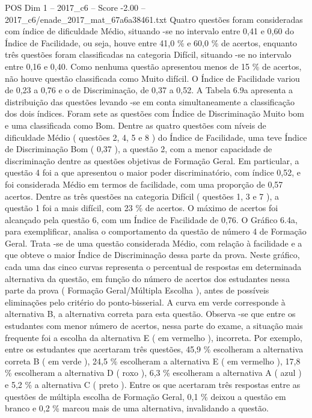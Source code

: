\begin{textsample}{POS Dim 1 – 2017\_c6 – Score -2.00 – 2017\_c6/enade\_2017\_mat\_67a6a38461.txt}
Quatro questões foram consideradas com índice de dificuldade Médio, situando -se no intervalo entre 0,41 e 0,60 do Índice de Facilidade, ou seja, houve entre 41,0 \% e 60,0 \% de acertos, enquanto três questões foram classificadas na categoria Difícil, situando -se no intervalo entre 0,16 e 0,40.
Como nenhuma questão apresentou menos de 15 \% de acertos, não houve questão classificada como Muito difícil.
O Índice de Facilidade variou de 0,23 a 0,76 e o de Discriminação, de 0,37 a 0,52.
A Tabela 6.9a apresenta a distribuição das questões levando -se em conta simultaneamente a classificação dos dois índices.
Foram sete as questões com Índice de Discriminação Muito bom e uma classificada como Bom.
Dentre as quatro questões com níveis de dificuldade Médio ( questões 2, 4, 5 e 8 ) do Índice de Facilidade, uma teve Índice de Discriminação Bom ( 0,37 ), a questão 2, com a menor capacidade de discriminação dentre as questões objetivas de Formação Geral.
Em particular, a questão 4 foi a que apresentou o maior poder discriminatório, com índice 0,52, e foi considerada Médio em termos de facilidade, com uma proporção de 0,57 acertos.
Dentre as três questões na categoria Difícil ( questões 1, 3 e 7 ), a questão 1 foi a mais difícil, com 23 \% de acertos.
O máximo de acertos foi alcançado pela questão 6, com um Índice de Facilidade de 0,76.
O Gráfico 6.4a, para exemplificar, analisa o comportamento da questão de número 4 de Formação Geral.
Trata -se de uma questão considerada Médio, com relação à facilidade e a que obteve o maior Índice de Discriminação dessa parte da prova.
Neste gráfico, cada uma das cinco curvas representa o percentual de respostas em determinada alternativa da questão, em função do número de acertos dos estudantes nessa parte da prova ( Formação Geral/Múltipla Escolha ), antes de possíveis eliminações pelo critério do ponto-bisserial.
A curva em verde corresponde à alternativa B, a alternativa correta para esta questão.
Observa -se que entre os estudantes com menor número de acertos, nessa parte do exame, a situação mais frequente foi a escolha da alternativa E ( em vermelho ), incorreta.
Por exemplo, entre os estudantes que acertaram três questões, 45,9 \% escolheram a alternativa correta B ( em verde ), 24,5 \% escolheram a alternativa E ( em vermelho ), 17,8 \% escolheram a alternativa D ( roxo ), 6,3 \% escolheram a alternativa A ( azul ) e 5,2 \% a alternativa C ( preto ).
Entre os que acertaram três respostas entre as questões de múltipla escolha de Formação Geral, 0,1 \% deixou a questão em branco e 0,2 \% marcou mais de uma alternativa, invalidando a questão.

\end{textsample}
